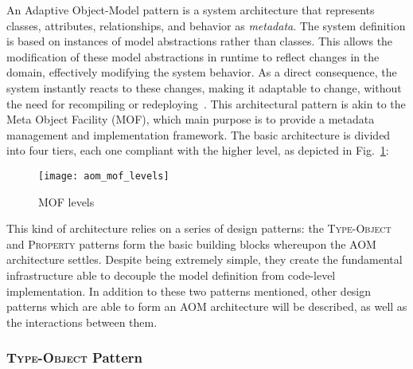 An Adaptive Object-Model pattern is a system architecture that represents classes, attributes, relationships, and behavior as \emph{metadata}. The system definition is based on instances of model abstractions rather than classes. This allows the modification of these model abstractions in runtime to reflect changes in the domain, effectively modifying the system behavior. As a direct consequence, the system instantly reacts to these changes, making it adaptable to change, without the need for recompiling or redeploying~\cite{YBJ01}. This architectural pattern is akin to the Meta Object Facility (MOF), which main purpose is to provide a metadata management and implementation framework. The basic architecture is divided into four tiers, each one compliant with the higher level\cite{mof}, as depicted in Fig.~\ref{fig:aom_mof_levels}:

\begin{figure}[H]
  \centering
  \texttt{[image: aom\_mof\_levels]}
  \caption{MOF levels}
  \label{fig:aom_mof_levels}
\end{figure}


This kind of architecture relies on a series of design patterns: the \textsc{Type-Object} and \textsc{Property} patterns form the basic building blocks whereupon the AOM architecture settles. Despite being extremely simple, they create the fundamental infrastructure able to decouple the model definition from code-level implementation. In addition to these two patterns mentioned, other design patterns which are able to form an AOM architecture will be described, as well as the interactions between them.

\subsubsection{\textsc{Type-Object} Pattern}\label{sec:type-object_pattern}

